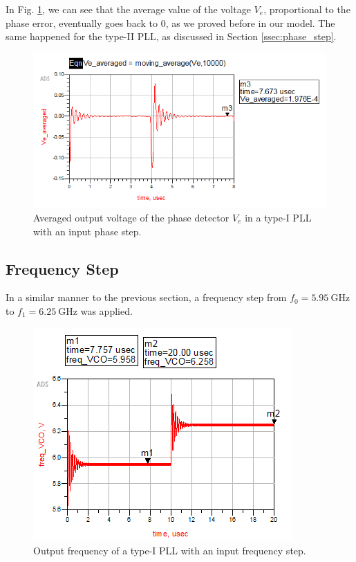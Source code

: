 \documentclass[lettersize,journal]{IEEEtran}
\begin{document}
In Fig. \ref{fig:type_one_phase_step_error}, we can see that the average value of the voltage $V_e$, proportional to the phase error, eventually goes back to 0, as we proved before in our model. The same happened for the type-II PLL, as discussed in Section \ref{ssec:phase_step}.

\begin{figure}[!h]
    \centering
    \includegraphics[width=1\linewidth]{images/type_one_pll/phase_step_error.png}
    \caption{Averaged output voltage of the phase detector $V_e$ in a type-I PLL with an input phase step.}
    \label{fig:type_one_phase_step_error}
\end{figure}

\subsection{Frequency Step}
In a similar manner to the previous section, a frequency step from $f_0=\qty{5.95}{\giga\hertz}$ to $f_1=\qty{6.25}{\giga\hertz}$ was applied.

\begin{figure}[!h]
    \centering
    \includegraphics[width=1\linewidth]{images/type_one_pll/freq_step_type_one.png}
    \caption{Output frequency of a type-I PLL with an input frequency step.}
    \label{fig:type_one_freq_step}
\end{figure}
\end{document}
